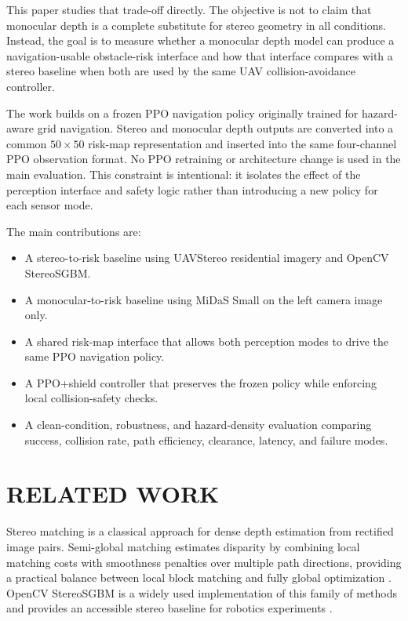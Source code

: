 \documentclass[12pt]{article}
\begin{document}
This paper studies that trade-off directly. The objective is not to claim that monocular depth is a complete substitute for stereo geometry in all conditions. Instead, the goal is to measure whether a monocular depth model can produce a navigation-usable obstacle-risk interface and how that interface compares with a stereo baseline when both are used by the same UAV collision-avoidance controller.

The work builds on a frozen PPO navigation policy originally trained for hazard-aware grid navigation. Stereo and monocular depth outputs are converted into a common $50 \times 50$ risk-map representation and inserted into the same four-channel PPO observation format. No PPO retraining or architecture change is used in the main evaluation. This constraint is intentional: it isolates the effect of the perception interface and safety logic rather than introducing a new policy for each sensor mode.

The main contributions are:

\begin{itemize}
\item A stereo-to-risk baseline using UAVStereo residential imagery and OpenCV StereoSGBM.
\item A monocular-to-risk baseline using MiDaS Small on the left camera image only.
\item A shared risk-map interface that allows both perception modes to drive the same PPO navigation policy.
\item A PPO+shield controller that preserves the frozen policy while enforcing local collision-safety checks.
\item A clean-condition, robustness, and hazard-density evaluation comparing success, collision rate, path efficiency, clearance, latency, and failure modes.
\end{itemize}

\section{\MakeUppercase{Related Work}}

\noindent
Stereo matching is a classical approach for dense depth estimation from rectified image pairs. Semi-global matching estimates disparity by combining local matching costs with smoothness penalties over multiple path directions, providing a practical balance between local block matching and fully global optimization \cite{hirschmuller2008sgm}. OpenCV StereoSGBM is a widely used implementation of this family of methods and provides an accessible stereo baseline for robotics experiments \cite{opencvsgbm}.
\end{document}
